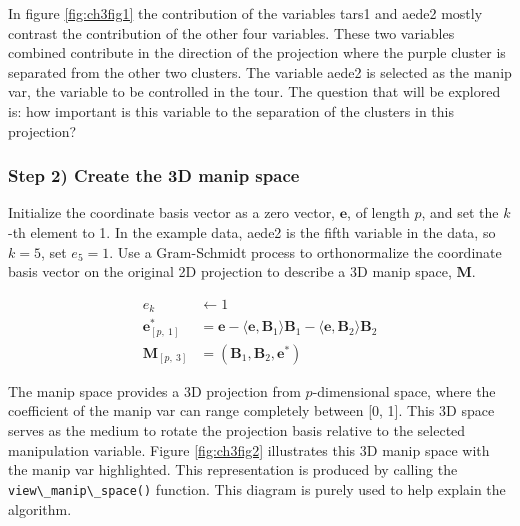 \documentclass{template/monashthesis}
\begin{document}
In figure \ref{fig:ch3fig1} the contribution of the variables tars1 and aede2 mostly contrast the contribution of the other four variables. These two variables combined contribute in the direction of the projection where the purple cluster is separated from the other two clusters. The variable aede2 is selected as the manip var, the variable to be controlled in the tour. The question that will be explored is: how important is this variable to the separation of the clusters in this projection?

\hypertarget{step-2-create-the-3d-manip-space}{%
\subsubsection{Step 2) Create the 3D manip space}\label{step-2-create-the-3d-manip-space}}

Initialize the coordinate basis vector as a zero vector, \(\textbf{e}\), of length \(p\), and set the \(k\)-th element to 1. In the example data, aede2 is the fifth variable in the data, so \(k=5\), set \(e_5=1\). Use a Gram-Schmidt process to orthonormalize the coordinate basis vector on the original 2D projection to describe a 3D manip space, \(\textbf{M}\).

\begin{align*}
  e_k &\leftarrow 1 \\ 
  \textbf{e}^*_{[p,~1]} &= \textbf{e} - \langle \textbf{e}, \textbf{B}_1 \rangle \textbf{B}_1 - \langle \textbf{e}, \textbf{B}_2 \rangle \textbf{B}_2 \\ 
  \textbf{M}_{[p,~3]} &= (\textbf{B}_1,\textbf{B}_2,\textbf{e}^*)
\end{align*}

The manip space provides a 3D projection from \(p\)-dimensional space, where the coefficient of the manip var can range completely between {[}0, 1{]}. This 3D space serves as the medium to rotate the projection basis relative to the selected manipulation variable. Figure \ref{fig:ch3fig2} illustrates this 3D manip space with the manip var highlighted. This representation is produced by calling the \texttt{view\textbackslash{}\_manip\textbackslash{}\_space()} function. This diagram is purely used to help explain the algorithm.
\end{document}
